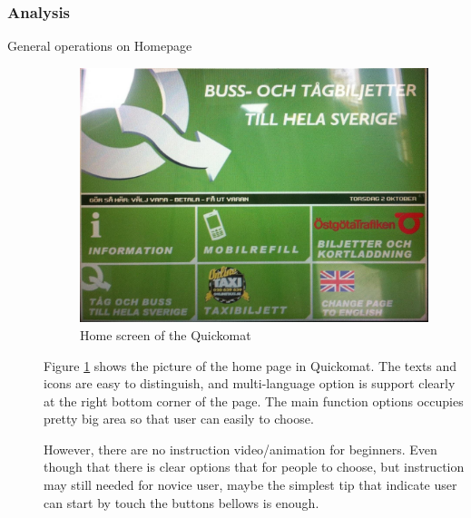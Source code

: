 \documentclass[twocolumn]{article}
\begin{document}
\subsubsection{Analysis}
\begin{description}
  \item[General operations on Homepage]
    \begin{figure}
      \centering
      \includegraphics[width=\columnwidth]{fig/home-of-quickomat.jpg}
      \caption{Home screen of the Quickomat}
      \label{fig:home-of-quickomat}
    \end{figure}

    Figure \ref{fig:home-of-quickomat} shows the picture of the home page in Quickomat. The texts and icons are easy to distinguish, and multi-language option is support clearly at the right bottom corner of the page. The main function options occupies pretty big area so that user can easily to choose.

    However, there are no instruction video/animation for beginners. Even though that there is clear options that for people to choose, but instruction may still needed for novice user, maybe the simplest tip that indicate user can start by touch the buttons bellows is enough.


\end{description}
\end{document}
